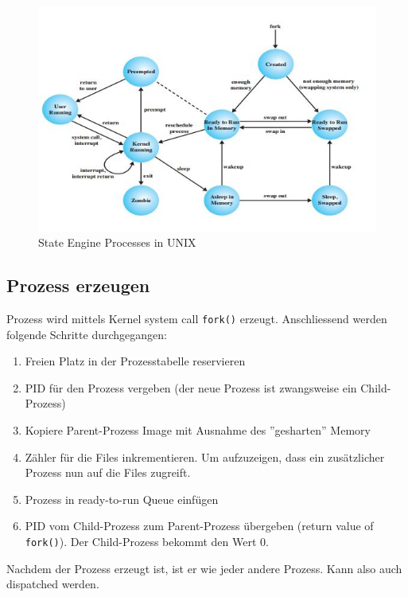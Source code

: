 \begin{figure}[h!]
	\centering
	\includegraphics[width=0.9\linewidth]{fig/system-software-state-engine-processes-unix}
	\caption{State Engine Processes in UNIX}
	\label{fig:system-software-state-engine-processes-unix}
\end{figure}

\subsection{Prozess erzeugen}
Prozess wird mittels Kernel system call \texttt{fork()} erzeugt. Anschliessend werden folgende Schritte durchgegangen:
\begin{enumerate}
	\item Freien Platz in der Prozesstabelle reservieren
	\item PID für den Prozess vergeben (der neue Prozess ist zwangsweise ein Child-Prozess)
	\item Kopiere Parent-Prozess Image mit Ausnahme des ''gesharten'' Memory
	\item Zähler für die Files inkrementieren. Um aufzuzeigen, dass ein zusätzlicher Prozess nun auf die Files zugreift.
	\item Prozess in ready-to-run Queue einfügen
	\item PID vom Child-Prozess zum Parent-Prozess übergeben (return value of \texttt{fork()}). Der Child-Prozess bekommt den Wert 0.
\end{enumerate}
Nachdem der Prozess erzeugt ist, ist er wie jeder andere Prozess. Kann also auch dispatched werden.

